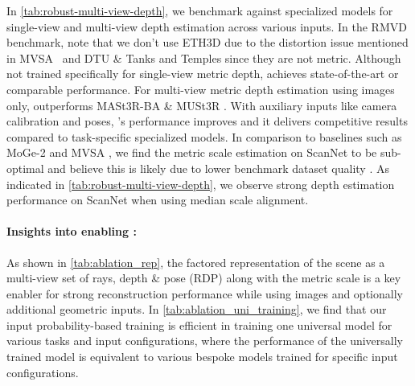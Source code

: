 In \cref{tab:robust-multi-view-depth}, we benchmark \coolname against specialized models for single-view and multi-view depth estimation across various inputs.
In the RMVD benchmark, note that we don't use ETH3D due to the distortion issue mentioned in MVSA~\cite{IzquiSFGTCABW2025} and DTU \& Tanks and Temples since they are not metric.
Although not trained specifically for single-view metric depth, \coolname achieves state-of-the-art or comparable performance.
For multi-view metric depth estimation using images only, \coolname outperforms MASt3R-BA \cite{LeroyCR2024} \& MUSt3R \cite{CabonSACCRL2025}.
With auxiliary inputs like camera calibration and poses, \coolname's performance improves and it delivers competitive results compared to task-specific specialized models.
In comparison to baselines such as MoGe-2 \cite{WangXDDXLSTY2025} and MVSA \cite{IzquiSFGTCABW2025}, we find the metric scale estimation on ScanNet to be sub-optimal and believe this is likely due to lower benchmark dataset quality \cite{WangXDXDTY2025, IzquiSFGTCABW2025}.
As indicated in \cref{tab:robust-multi-view-depth}, we observe strong depth estimation performance on ScanNet when using median scale alignment.








\paragraph{Insights into enabling \coolname:}
\label{para:insights}

As shown in \cref{tab:ablation_rep}, the factored representation of the scene as a multi-view set of rays, depth \& pose (RDP) along with the metric scale is a key enabler for strong reconstruction performance while using images and optionally additional geometric inputs.
In \cref{tab:ablation_uni_training}, we find that our input probability-based training is efficient in training one universal model for various tasks and input configurations, where the performance of the universally trained model is equivalent to various bespoke models trained for specific input configurations.






